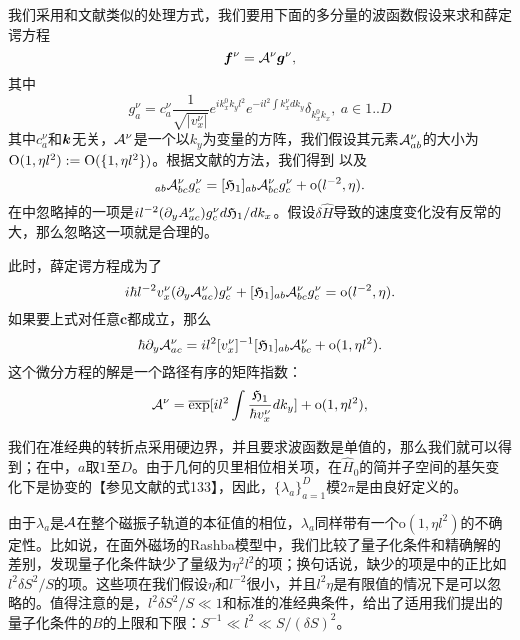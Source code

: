 我们采用和文献类似的处理方式，我们要用下面的多分量的波函数假设来求和薛定谔方程
\begin{equation}
\boldsymbol{f}^\nu={\cal A}^\nu\boldsymbol{g}^\nu,\label{wkb-wf}
\end{equation}
其中
\begin{equation}
g_a^\nu=c_{a}^\nu\frac{1}{\sqrt{|v_x^\nu|}}e^{ik^{0}_{x}k_{y}l^{2}}e^{-il^{2}\int k_{x}^\nu dk_{y}}\delta_{k^{0}_{x}k_{x}},~a\in{1..D}
\end{equation}
其中$c_a^\nu$和$\boldsymbol{k}$无关，${\cal A}^\nu$是一个以$k_y$为变量的方阵，我们假设其元素${\cal A}_{ab}^\nu$的大小为$\text{O}(1, \eta l^2):=\text{O}(\{1,\eta l^2\})$。根据文献的方法，我们得到
以及
\begin{equation}
[\effH_{1}(\bK)]_{ab}\A_{bc}^\nu g_{c}^\nu=[\effH_{1}]_{ab}\A_{bc}^\nu g_{c}^\nu+\text{o}(l^{-2}, \eta).\label{effH1onA}
\end{equation}
在中忽略掉的一项是$i l^{-2}(\partial_{y}A_{ac}^\nu)g_{c}^\nu d\mathfrak{H}_1/dk_x$。假设$\delta\hat{H}$导致的速度变化没有反常的大，那么忽略这一项就是合理的。

此时，薛定谔方程成为了 
\begin{equation}
i\hbar l^{-2} v_{x}^\nu (\partial_{y}{\cal A}_{ac}^\nu)  g_{c}^\nu+[\mathfrak{H}_{1}]_{ab}{\cal A}_{bc}^\nu g_{c}^\nu=\text{o}(l^{-2}, \eta).
\end{equation}
如果要上式对任意$\mathbf{c}$都成立，那么
\begin{equation}
\hbar\partial_{y}{\cal A}_{ac}^\nu=il^{2}[v_{x}^\nu]^{-1}[\mathfrak{H}_{1}]_{ab}{\cal A}_{bc}^\nu+{\text{o}(1, \eta l^2)}.
\end{equation}
这个微分方程的解是一个路径有序的矩阵指数：
\begin{equation}
{\cal A}^\nu=\overline{\exp}[il^{2}\int\frac{\mathfrak{H}_{1}}{\hbar v_{x}^\nu}dk_{y}]+{\text{o}(1, \eta l^2)},
\end{equation}

我们在准经典的转折点采用硬边界，并且要求波函数是单值的\cite{100p}，那么我们就可以得到；在中，$a$取$1$至$D$。由于几何的贝里相位相关项，在$\hat{H}_0$的简并子空间的基矢变化下是协变的【参见文献的式133】，因此，$\{\lambda_a\}_{a=1}^D$模$2\pi$是由良好定义的。

由于$\lambda_a$是${\cal A}$在整个磁振子轨道的本征值的相位，$\lambda_a$同样带有一个$\text{o}(1, \eta l^2)$的不确定性。比如说，在面外磁场的Rashba模型中，我们比较了量子化条件和精确解的差别，发现量子化条件缺少了量级为$\eta^2 l^2$的项；换句话说，缺少的项是中的正比如 $l^2\delta S^2/S$的项。这些项在我们假设$\eta$和$l^{-2}$很小，并且$l^2\eta$是有限值的情况下是可以忽略的。值得注意的是，$l^2\delta S^2/S\ll 1$和标准的准经典条件，给出了适用我们提出的量子化条件的$B$的上限和下限：$S^{-1} \ll l^2 \ll S/(\delta S)^2$。


